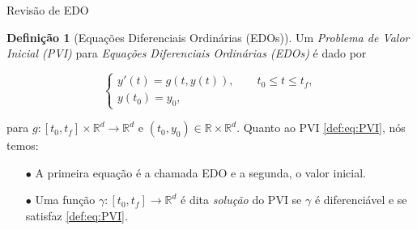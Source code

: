 \documentclass{beamer}
\newcommand{\R}{\mathbb{R}}
\theoremstyle{plain}
\theoremstyle{definition}
\newtheorem{defi}{Definição}
\begin{document}
\begin{frame}{Revisão de EDO}

    \small
    \begin{defi}[Equações Diferenciais Ordinárias (EDOs)]
        \label{def:1:EDO} 
        Um \textit{Problema de Valor Inicial (PVI)} para \textit{Equações Diferenciais Ordinárias (EDOs)} é dado por


        \begin{equation}
            \begin{cases}
                y'(t) = g(t, y(t)), \qquad t_0 \leq t\leq t_f,\\
                y(t_0) = y_0,
            \end{cases}
            \label{def:eq:PVI}
        \end{equation}



        para $g: [t_0, t_f] \times \R^d \to \R^d$ e $(t_0, y_0) \in \R \times \R^d$. Quanto ao PVI \ref{def:eq:PVI}, nós temos:

        \begin{enumerate}
            \item[$\bullet$] A primeira equação é a chamada EDO e a segunda, o valor inicial.
            \item[$\bullet$] Uma função $\gamma: [t_0, t_f] \to \R^d$ é dita \textit{solução} do PVI se $\gamma$ é diferenciável e se satisfaz \ref{def:eq:PVI}.
        \end{enumerate}

    \end{defi}

\end{frame}

\end{document}
